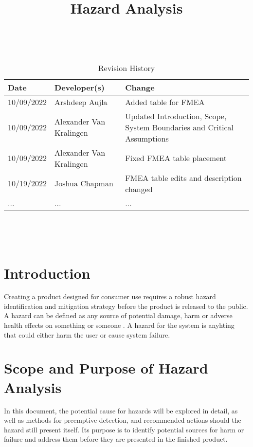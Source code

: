 \documentclass{article}
\title{Hazard Analysis\\\progname}
\author{\authname}
\date{}
\begin{document}
\maketitle
\thispagestyle{empty}

~\newpage


\begin{table}[hp]
\caption{Revision History} \label{TblRevisionHistory}
\begin{tabularx}{\textwidth}{llX}
\toprule
\textbf{Date} & \textbf{Developer(s)} & \textbf{Change}\\
\midrule
10/09/2022 & Arshdeep Aujla & Added table for FMEA\\
10/09/2022 & Alexander Van Kralingen & Updated Introduction, Scope, System Boundaries and Critical Assumptions\\
10/09/2022 & Alexander Van Kralingen & Fixed FMEA table placement\\
10/19/2022 & Joshua Chapman & FMEA table edits and description changed\\
... & ... & ...\\
\bottomrule
\end{tabularx}
\end{table}

~\newpage

\tableofcontents

~\newpage



\section{Introduction}{
    Creating a product designed for consumer use requires a robust hazard identification and mitigation strategy before the product is released to the public. A hazard can be defined as any source of potential damage, harm or adverse health effects on something or someone \cite{CCOHS}. A hazard for the \progname{} system is anyhting that could either harm the user or cause system failure.
}

\section{Scope and Purpose of Hazard Analysis}{
    In this document, the potential cause for hazards will be explored in detail, as well as methods for preemptive detection, and recommended actions should the hazard still present itself. Its purpose is to identify potential sources for harm or failure and address them before they are presented in the finished product.
}
\end{document}
